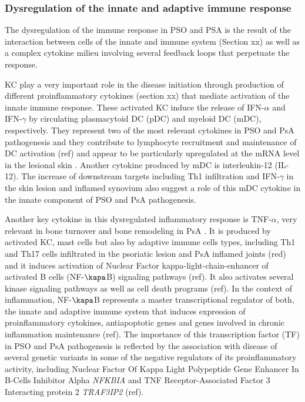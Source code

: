 \subsubsection{Dysregulation of the innate and adaptive immune response}
The dysregulation of the immune response in PSO and PSA is the result of the interaction between cells of the innate and immune system (Section xx) as well as a complex cytokine milieu involving several feedback loops that perpetuate the response.

KC play a very important role in the disease initiation through production of different proinflammatory cytokines (section xx) that mediate activation of the innate immune response. These activated KC induce the release of IFN-$\alpha$ and IFN-$\gamma$ by circulating plasmacytoid DC (pDC) and myeloid DC (mDC), respectively. They represent two of the most relevant cytokines in PSO and PsA pathogenesis and they contribute to lymphocyte recruitment and maintenance of DC activation (ref) and appear to be particularly upregulated at the mRNA level in the lesional skin \parencite{Schmid1994}. Another cytokine produced by mDC is interleukin-12 (IL-12). The increase of downstream targets including Th1 infiltration and IFN-$\gamma$ in the skin lesion and inflamed synovium also suggest a role of this mDC cytokine in the innate component of PSO and PsA pathogenesis. 

Another key cytokine in this dysregulated inflammatory response is TNF-$\alpha$, very relevant in bone turnover and bone remodeling in PsA \parencite{Mensah2008}. It is produced by activated KC, mast cells but also by adaptive immune cells types, including Th1 and Th17 cells infiltrated in the psoriatic lesion and PsA inflamed joints (red) and it induces activation of Nuclear Factor kappa-light-chain-enhancer of activated B cells (NF-$\kapa$B) signaling pathways (ref). It also activates several kinase signaling pathways as well as cell death programs (ref). In the context of inflammation, NF-$\kapa$B represents a master transcriptional regulator of both, the innate and adaptive immune system that induces expression of proinflammatory cytokines, antiapoptotic genes and genes involved in chronic inflammation maintenance (ref). The importance of this transcription factor (TF) in PSO and PsA pathogenesis is reflected by the association with disease of several genetic variants in some of the negative regulators of its proinflammatory activity, including Nuclear Factor Of Kappa Light Polypeptide Gene Enhancer In B-Cells Inhibitor Alpha \textit{NFKBIA} and TNF Receptor-Associated Factor 3 Interacting protein 2 \textit{TRAF3IP2} (ref).
 
